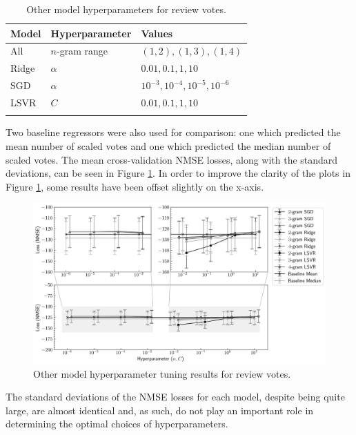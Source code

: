\begin{table}[ht]
    \centering
    \begin{tabular}{l l l}
        \toprule
        \textbf{Model} & \textbf{Hyperparameter} & \textbf{Values}\\\midrule
        All & $n$-gram range & $(1, 2), (1, 3), (1, 4)$\\
        Ridge & $\alpha$ & $0.01, 0.1, 1, 10$\\
        SGD & $\alpha$ & $10^{-3}, 10^{-4}, 10^{-5}, 10^{-6}$\\
        LSVR & $C$ & $0.01, 0.1, 1, 10$\\
        \bottomrule\\
    \end{tabular}
    \caption{Other model hyperparameters for review votes.}
    \label{tab:DI_RF_Votes_BaseHP}
\end{table}

Two baseline regressors were also used for comparison: one which predicted the mean number of scaled votes and one which predicted the median number of scaled votes. The mean cross-validation NMSE losses, along with the standard deviations, can be seen in Figure \ref{fig:DI_RF_Votes_BaseHP}. In order to improve the clarity of the plots in Figure \ref{fig:DI_RF_Votes_BaseHP}, some results have been offset slightly on the x-axis.

\begin{figure}[ht]
    \hspace*{-0.3in}
    \includegraphics[scale=0.55]{figures/05_impl/01_rfp/02_votes/plot_hyperparams_base.png}
    \caption{Other model hyperparameter tuning results for review votes.}
    \label{fig:DI_RF_Votes_BaseHP}
\end{figure}

The standard deviations of the NMSE losses for each model, despite being quite large, are almost identical and, as such, do not play an important role in determining the optimal choices of hyperparameters.


